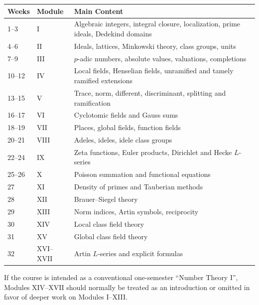 \documentclass[11pt,a4paper]{article}
\begin{document}
\begin{longtable}{p{}p{}p{}}
\toprule
\textbf{Weeks} & \textbf{Module} & \textbf{Main Content} \\
\midrule
1--3 &
I &
Algebraic integers, integral closure, localization,
prime ideals, Dedekind domains \\

4--6 &
II &
Ideals, lattices, Minkowski theory, class groups,
units \\

7--9 &
III &
\(p\)-adic numbers, absolute values, valuations,
completions \\

10--12 &
IV &
Local fields, Henselian fields, unramified and
tamely ramified extensions \\

13--15 &
V &
Trace, norm, different, discriminant, splitting
and ramification \\

16--17 &
VI &
Cyclotomic fields and Gauss sums \\

18--19 &
VII &
Places, global fields, function fields \\

20--21 &
VIII &
Adeles, ideles, idele class groups \\

22--24 &
IX &
Zeta functions, Euler products, Dirichlet and
Hecke \(L\)-series \\

25--26 &
X &
Poisson summation and functional equations \\

27 &
XI &
Density of primes and Tauberian methods \\

28 &
XII &
Brauer--Siegel theory \\

29 &
XIII &
Norm indices, Artin symbols, reciprocity \\

30 &
XIV &
Local class field theory \\

31 &
XV &
Global class field theory \\

32 &
XVI--XVII &
Artin \(L\)-series and explicit formulas
\\
\bottomrule
\end{longtable}

\noindent
If the course is intended as a conventional one-semester
``Number Theory I'', Modules XIV--XVII should normally be treated
as an introduction or omitted in favor of deeper work on Modules
I--XIII.
\end{document}
